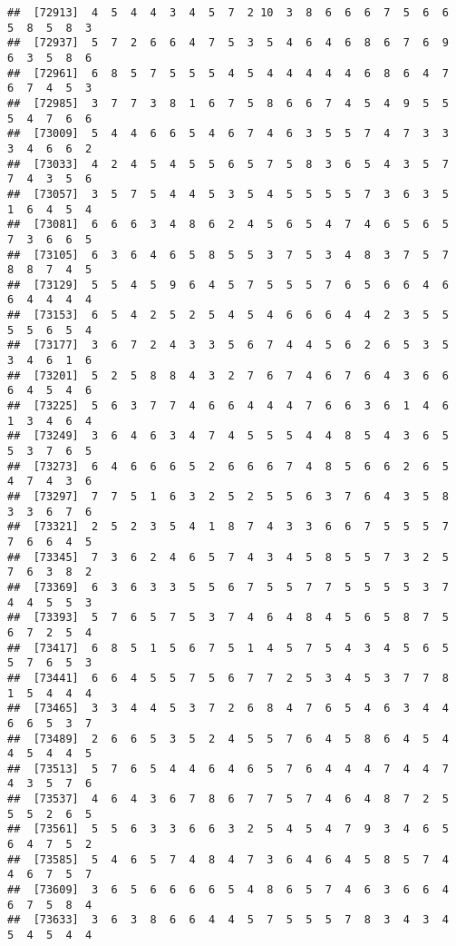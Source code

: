 \documentclass[
]{book}
\begin{document}
\begin{verbatim}
##  [72913]  4  5  4  4  3  4  5  7  2 10  3  8  6  6  6  7  5  6  6  5  8  5  8  3
##  [72937]  5  7  2  6  6  4  7  5  3  5  4  6  4  6  8  6  7  6  9  6  3  5  8  6
##  [72961]  6  8  5  7  5  5  5  4  5  4  4  4  4  4  6  8  6  4  7  6  7  4  5  3
##  [72985]  3  7  7  3  8  1  6  7  5  8  6  6  7  4  5  4  9  5  5  5  4  7  6  6
##  [73009]  5  4  4  6  6  5  4  6  7  4  6  3  5  5  7  4  7  3  3  3  4  6  6  2
##  [73033]  4  2  4  5  4  5  5  6  5  7  5  8  3  6  5  4  3  5  7  7  4  3  5  6
##  [73057]  3  5  7  5  4  4  5  3  5  4  5  5  5  5  7  3  6  3  5  1  6  4  5  4
##  [73081]  6  6  6  3  4  8  6  2  4  5  6  5  4  7  4  6  5  6  5  7  3  6  6  5
##  [73105]  6  3  6  4  6  5  8  5  5  3  7  5  3  4  8  3  7  5  7  8  8  7  4  5
##  [73129]  5  5  4  5  9  6  4  5  7  5  5  5  7  6  5  6  6  4  6  6  4  4  4  4
##  [73153]  6  5  4  2  5  2  5  4  5  4  6  6  6  4  4  2  3  5  5  5  5  6  5  4
##  [73177]  3  6  7  2  4  3  3  5  6  7  4  4  5  6  2  6  5  3  5  3  4  6  1  6
##  [73201]  5  2  5  8  8  4  3  2  7  6  7  4  6  7  6  4  3  6  6  6  4  5  4  6
##  [73225]  5  6  3  7  7  4  6  6  4  4  4  7  6  6  3  6  1  4  6  1  3  4  6  4
##  [73249]  3  6  4  6  3  4  7  4  5  5  5  4  4  8  5  4  3  6  5  5  3  7  6  5
##  [73273]  6  4  6  6  6  5  2  6  6  6  7  4  8  5  6  6  2  6  5  4  7  4  3  6
##  [73297]  7  7  5  1  6  3  2  5  2  5  5  6  3  7  6  4  3  5  8  3  3  6  7  6
##  [73321]  2  5  2  3  5  4  1  8  7  4  3  3  6  6  7  5  5  5  7  7  6  6  4  5
##  [73345]  7  3  6  2  4  6  5  7  4  3  4  5  8  5  5  7  3  2  5  7  6  3  8  2
##  [73369]  6  3  6  3  3  5  5  6  7  5  5  7  7  5  5  5  5  3  7  4  4  5  5  3
##  [73393]  5  7  6  5  7  5  3  7  4  6  4  8  4  5  6  5  8  7  5  6  7  2  5  4
##  [73417]  6  8  5  1  5  6  7  5  1  4  5  7  5  4  3  4  5  6  5  5  7  6  5  3
##  [73441]  6  6  4  5  5  7  5  6  7  7  2  5  3  4  5  3  7  7  8  1  5  4  4  4
##  [73465]  3  3  4  4  5  3  7  2  6  8  4  7  6  5  4  6  3  4  4  6  6  5  3  7
##  [73489]  2  6  6  5  3  5  2  4  5  5  7  6  4  5  8  6  4  5  4  4  5  4  4  5
##  [73513]  5  7  6  5  4  4  6  4  6  5  7  6  4  4  4  7  4  4  7  4  3  5  7  6
##  [73537]  4  6  4  3  6  7  8  6  7  7  5  7  4  6  4  8  7  2  5  5  5  2  6  5
##  [73561]  5  5  6  3  3  6  6  3  2  5  4  5  4  7  9  3  4  6  5  6  4  7  5  2
##  [73585]  5  4  6  5  7  4  8  4  7  3  6  4  6  4  5  8  5  7  4  4  6  7  5  7
##  [73609]  3  6  5  6  6  6  6  5  4  8  6  5  7  4  6  3  6  6  4  6  7  5  8  4
##  [73633]  3  6  3  8  6  6  4  4  5  7  5  5  5  7  8  3  4  3  4  5  4  5  4  4

\end{verbatim}
\end{document}
